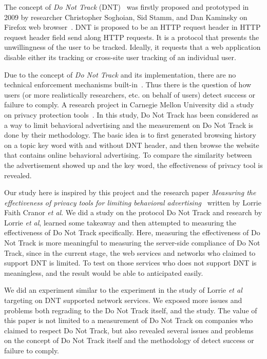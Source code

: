 \documentclass{sig-alternate}
\begin{document}
The concept of \emph{Do Not Track} (DNT)~\cite{tschofenignot} was firstly proposed and prototyped in 2009 by researcher Christopher Soghoian, Sid Stamm, and Dan Kaminsky on Firefox web browser~\cite{wikidnt}. DNT is proposed to be an HTTP request header in HTTP request header field send along HTTP requests. It is a protocol that presents the unwillingness of the user to be tracked. Ideally, it requests that a web application disable either its tracking or cross-site user tracking of an individual user.

Due to the concept of \emph{Do Not Track} and its implementation, there are no technical enforcement mechanisms built-in~\cite{tschofenignot}. Thus there is the question of how users (or more realistically researchers, etc. on behalf of users) detect success or failure to comply. A research project in Carnegie Mellon University did a study on privacy protection tools~\cite{balebako2012measuring}. In this study, Do Not Track has been considered as a way to limit behavioral advertising and the measurement on Do Not Track is done by their methodology. The basic idea is to first generated browsing history on a topic key word with and without DNT header, and then browse the website that contains online behavioral advertising. To compare the similarity between the advertisement showed up and the key word, the effectiveness of privacy tool is revealed.

Our study here is inspired by this project and the research paper \emph{Measuring the effectiveness of privacy tools for limiting behavioral advertising}~\cite{balebako2012measuring} written by Lorrie Faith Cranor \emph{et al}. We did a study on the protocol Do Not Track and research by Lorrie \emph{et al}, learned some takeaway and then attempted to measuring the effectiveness of Do Not Track specifically. Here, measuring the effectiveness of Do Not Track is more meaningful to measuring the server-side compliance of Do Not Track, since in the current stage, the web services and networks who claimed to support DNT is limited. To test on those services who does not support DNT is meaningless, and the result would be able to anticipated easily.

We did an experiment similar to the experiment in the study of Lorrie \emph{et al} targeting on DNT supported network services. We exposed more issues and problems both regrading to the Do Not Track itself, and the study. The value of this paper is not limited to a measurement of Do Not Track on companies who claimed to respect Do Not Track, but also revealed several issues and problems on the concept of Do Not Track itself and the methodology of detect success or failure to comply.
\end{document}
